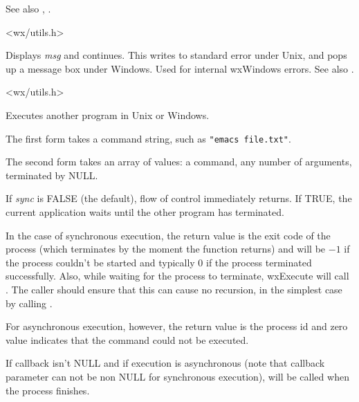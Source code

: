 See also , .


<wx/utils.h>

\label{wxerror}


Displays {\it msg} and continues. This writes to standard error under
Unix, and pops up a message box under Windows. Used for internal
wxWindows errors. See also .


<wx/utils.h>

\label{wxexecute}



Executes another program in Unix or Windows.

The first form takes a command string, such as {\tt "emacs file.txt"}.

The second form takes an array of values: a command, any number of
arguments, terminated by NULL.

If {\it sync} is FALSE (the default), flow of control immediately returns.
If TRUE, the current application waits until the other program has terminated.

In the case of synchronous execution, the return value is the exit code of
the process (which terminates by the moment the function returns) and will be
$-1$ if the process couldn't be started and typically 0 if the process
terminated successfully. Also, while waiting for the process to
terminate, wxExecute will call . The caller
should ensure that this can cause no recursion, in the simplest case by 
calling .

For asynchronous execution, however, the return value is the process id and
zero value indicates that the command could not be executed.

If callback isn't NULL and if execution is asynchronous (note that callback
parameter can not be non NULL for synchronous execution), 
 will be called when
the process finishes.

